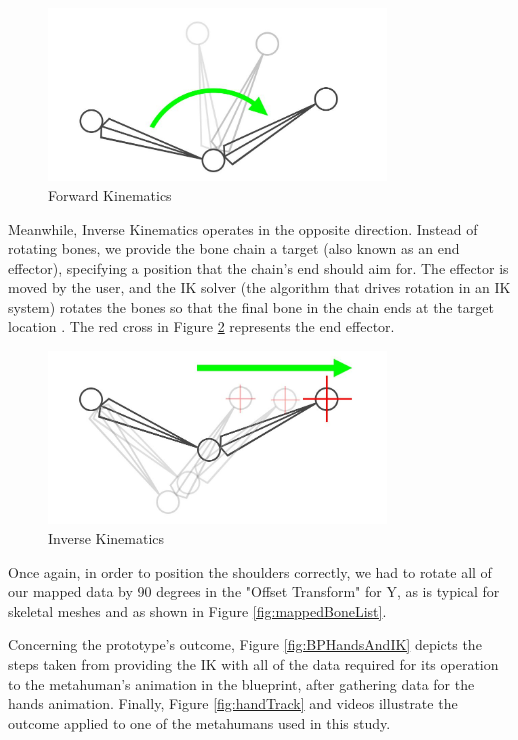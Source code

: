 \begin{figure}[!htb]
\includegraphics[width=0.8\textwidth]{figures/diagram_FK.png}
\centering
\caption{Forward Kinematics}
\label{fig:diagramFK}
\end{figure}

Meanwhile, Inverse Kinematics operates in the opposite direction. Instead of rotating bones, we provide the bone chain a target (also known as an end effector), specifying a position that the chain's end should aim for. The effector is moved by the user, and the IK solver (the algorithm that drives rotation in an IK system) rotates the bones so that the final bone in the chain ends at the target location \cite{IK}. The red cross in Figure \ref{fig:diagramIK} represents the end effector.

\begin{figure}[!htb]
\includegraphics[width=0.8\textwidth]{figures/diagramIK.png}
\centering
\caption{Inverse Kinematics}
\label{fig:diagramIK}
\end{figure}

Once again, in order to position the shoulders correctly, we had to rotate all of our mapped data by 90 degrees in the "Offset Transform" for Y, as is typical for skeletal meshes and as shown in Figure \ref{fig:mappedBoneList}.

Concerning the prototype's outcome, Figure \ref{fig:BPHandsAndIK} depicts the steps taken from providing the IK with all of the data required for its operation to the metahuman's animation in the blueprint, after gathering data for the hands animation. Finally, Figure \ref{fig:handTrack} and videos \cite{APT1,APT2} illustrate the outcome applied to one of the metahumans used in this study.

